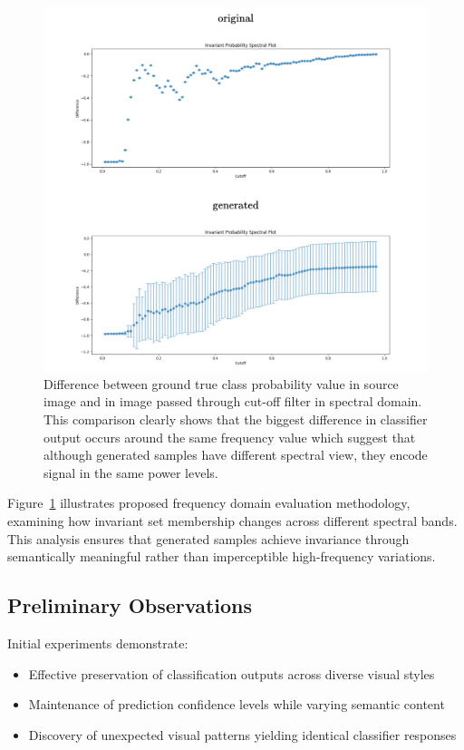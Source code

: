 \documentclass[licencjacka,en]{pracamgr}
\begin{document}
\begin{figure}[h]
\centering
\includegraphics[width=\linewidth]{figures/main/spectral_analysis_2.png}
\caption{Difference between ground true class probability value in source image and in image passed through cut-off filter in spectral domain. This comparison clearly shows that the biggest difference in classifier output occurs around the same frequency value which suggest that although generated samples have different spectral view, they encode signal in the same power levels.}
\label{fig:frequency_analysis_2}
\end{figure}

Figure~\ref{fig:frequency_analysis_2} illustrates proposed frequency domain evaluation methodology, examining how invariant set membership changes across different spectral bands. This analysis ensures that generated samples achieve invariance through semantically meaningful rather than imperceptible high-frequency variations.

\subsection{Preliminary Observations}

Initial experiments demonstrate:
\begin{itemize}
\item Effective preservation of classification outputs across diverse visual styles
\item Maintenance of prediction confidence levels while varying semantic content  
\item Discovery of unexpected visual patterns yielding identical classifier responses
\end{itemize}
\end{document}
